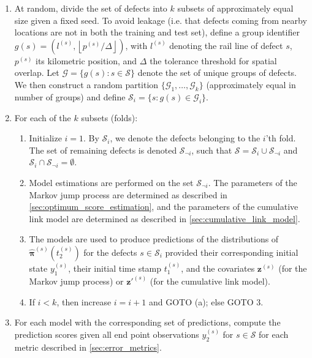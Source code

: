 \documentclass{article}
\begin{document}
\begin{enumerate}
    \item At random, divide the set of defects into $k$ subsets of approximately equal size given a fixed seed. To avoid leakage (i.e. that defects coming from nearby locations are not in both the training and test set), define a group identifier $g(s) = (l^{(s)},\left \lfloor{p^{(s)}/\Delta}\right \rfloor )$, with $l^{(s)}$ denoting the rail line of defect $s$, $p^{(s)}$ its kilometric position, and $\Delta$ the tolerance threshold for spatial overlap. Let $\mathcal{G} = \{g(s) : s \in \mathcal S\}$ denote the set of unique groups of defects. We then construct a random partition $\{\mathcal{G}_1, \dots, \mathcal{G}_k\}$ (approximately equal in number of groups) and define $\mathcal S_i = \{s : g(s) \in \mathcal G_i\}$. 
    \item For each of the $k$ subsets (folds):
    \begin{enumerate}
        \item Initialize $i = 1$. By $\mathcal{S}_i$, we denote the defects belonging to the $i$'th fold. The set of remaining defects is denoted $\mathcal{S}_{\neg i}$, such that $\mathcal{S} = \mathcal{S}_i \cup \mathcal{S}_{\neg i}$ and $\mathcal{S}_i \cap \mathcal{S}_{\neg i} = \emptyset$.
        \item Model estimations are performed on the set $\mathcal{S}_{\neg i}$. The parameters of the Markov jump process are determined as described in \cref{sec:optimum_score_estimation}, and the parameters of the cumulative link model are determined as described in \cref{sec:cumulative_link_model}.
        \item The models are used to produce predictions of the distributions of $\widehat{\bm{\pi}}^{(s)}\left( t_2^{(s)}\right)$ for the defects $s \in \mathcal{S}_i$ provided their corresponding initial state $y_1^{(s)}$, their initial time stamp $t_1^{(s)}$, and the covariates $\bm{z}^{(s)}$ (for the Markov jump process) or $\bm{z}'^{(s)}$ (for the cumulative link model).
        \item If $i < k$, then increase $i = i + 1$ and GOTO (a); else GOTO 3.
    \end{enumerate}
    \item For each model with the corresponding set of predictions, compute the prediction scores given all end point observations $y_2^{(s)}$ for $s \in \mathcal{S}$ for each metric described in \cref{sec:error_metrics}.
\end{enumerate}
 
\end{document}
